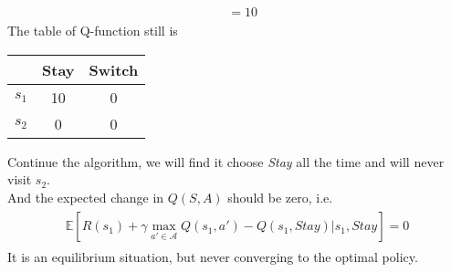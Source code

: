 \documentclass{myhw}
\begin{document}
\begin{homeworkProblem}
\begin{homeworkSection}
\begin{gather*}
\begin{aligned}
&= 10
\end{aligned}
\end{gather*}
The table of Q-function still is 
\begin{center}
\begin{tabular}{c|c|c}
  & Stay & Switch \\ 
 \hline
 $s_1$ & 10 & 0 \\  
 \hline
 $s_2$ & 0 & 0    
\end{tabular} 
\end{center}
Continue the algorithm, we will find it choose \emph{Stay} all the time and will never visit $s_2$. \\
And the expected change in $Q(S, A)$ should be zero, i.e.
\begin{gather*}
\begin{aligned}
\mathbb{E} [R(s_1) + \gamma \max_{a'\in\mathcal{A}} Q(s_1,a') - Q(s_1,Stay)|s_1,Stay] = 0
\end{aligned}
\end{gather*}
It is an equilibrium situation, but never converging to the optimal policy.
\end{homeworkSection}
\end{homeworkProblem}
\end{document}
